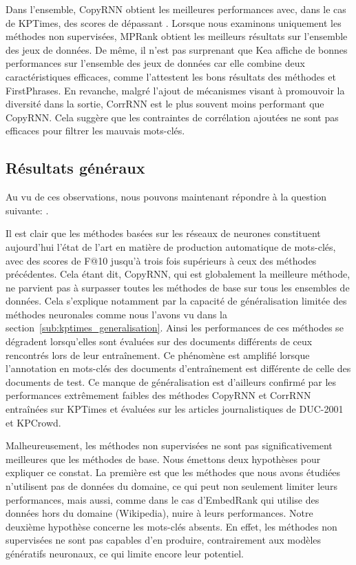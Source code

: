 Dans l'ensemble, CopyRNN obtient les meilleures performances avec, dans le cas de KPTimes, des scores de \map{} dépassant .
%
Lorsque nous examinons uniquement les méthodes non supervisées, MPRank obtient les meilleurs résultats sur l'ensemble des jeux de données.
%
De même, il n'est pas surprenant que Kea affiche de bonnes performances sur l'ensemble des jeux de données car elle combine deux caractéristiques efficaces, comme l'attestent les bons résultats des méthodes \tfidf{} et FirstPhrases.
%
En revanche, malgré l'ajout de mécanismes visant à promouvoir la diversité dans la sortie, CorrRNN est le plus souvent moins performant que CopyRNN. Cela suggère que les contraintes de corrélation ajoutées ne sont pas efficaces pour filtrer les mauvais mots-clés.


\subsection{Résultats généraux}

Au vu de ces observations, nous pouvons maintenant répondre à la question suivante: .

Il est clair que les méthodes basées sur les réseaux de neurones constituent aujourd'hui l'état de l'art en matière de production automatique de mots-clés, avec des scores de F@10 jusqu'à trois fois supérieurs à ceux des méthodes précédentes.
Cela étant dit, CopyRNN, qui est globalement la meilleure méthode, ne parvient pas à surpasser toutes les méthodes de base sur tous les ensembles de données.
Cela s'explique notamment par la capacité de généralisation limitée des méthodes neuronales comme nous l'avons vu dans la section~\ref{sub:kptimes_generalisation}.
Ainsi les performances de ces méthodes se dégradent lorsqu'elles sont évaluées sur des documents différents de ceux rencontrés lors de leur entraînement. Ce phénomène est amplifié lorsque l'annotation en mots-clés des documents d'entraînement est différente de celle des documents de test.
Ce manque de généralisation est d'ailleurs confirmé par les performances extrêmement faibles des méthodes CopyRNN et CorrRNN entraînées sur KPTimes et évaluées sur les articles journalistiques de DUC-2001 et KPCrowd.

Malheureusement, les méthodes non supervisées ne sont pas significativement meilleures que les méthodes de base.
%
Nous émettons deux hypothèses pour expliquer ce constat.
La première est que les méthodes que nous avons étudiées n'utilisent pas de données du domaine, ce qui peut non seulement limiter leurs performances, mais aussi, comme dans le cas d'EmbedRank qui utilise des données hors du domaine (Wikipedia), nuire à leurs performances.
%
Notre deuxième hypothèse concerne les mots-clés absents. En effet, les méthodes non supervisées ne sont pas capables d'en produire,  contrairement aux modèles génératifs neuronaux, ce qui limite encore leur potentiel.


